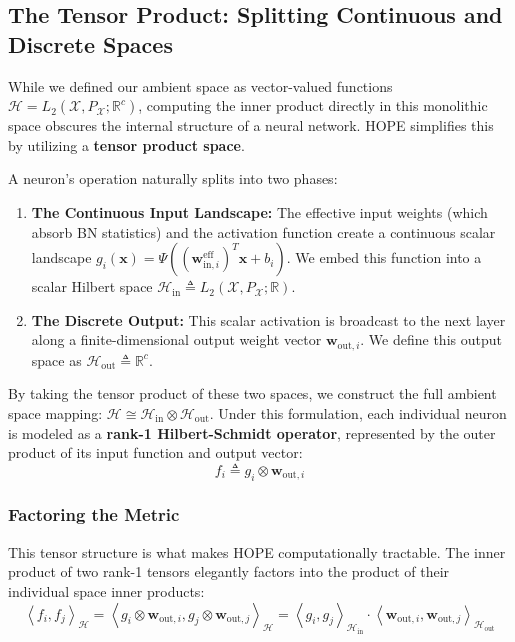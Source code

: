 \documentclass[11pt, a4paper, copyright, gdm]{google}
\newcommand{\inner}[2]{\left\langle#1, #2\right\rangle}
\newcommand{\wVect}{\boldsymbol{w}}
\newcommand{\xVect}{\boldsymbol{x}}
\newcommand{\calH}{\mathcal{H}}
\newcommand{\calX}{\mathcal{X}}
\newcommand{\R}{\mathbb{R}}
\theoremstyle{definition}
\begin{document}
\subsection{The Tensor Product: Splitting Continuous and Discrete Spaces}

While we defined our ambient space as vector-valued functions $\calH = L_2(\calX, P_{\calX}; \R^c)$, computing the inner product directly in this monolithic space obscures the internal structure of a neural network. HOPE simplifies this by utilizing a \textbf{tensor product space}.

A neuron's operation naturally splits into two phases:
\begin{enumerate}
    \item \textbf{The Continuous Input Landscape:} The effective input weights (which absorb BN statistics) and the activation function create a continuous scalar landscape $g_i(\xVect) = \Psi((\wVect_{\text{in},i}^{\text{eff}})^T \xVect + b_i)$. We embed this function into a scalar Hilbert space $\calH_{\text{in}} \triangleq L_2(\calX, P_{\calX}; \R)$.
    \item \textbf{The Discrete Output:} This scalar activation is broadcast to the next layer along a finite-dimensional output weight vector $\wVect_{\text{out}, i}$. We define this output space as $\calH_{\text{out}} \triangleq \R^c$.
\end{enumerate}

By taking the tensor product of these two spaces, we construct the full ambient space mapping: $\calH \cong \calH_{\text{in}} \otimes \calH_{\text{out}}$. Under this formulation, each individual neuron is modeled as a \textbf{rank-1 Hilbert-Schmidt operator}, represented by the outer product of its input function and output vector:
\begin{equation}
    f_i \triangleq g_i \otimes \wVect_{\text{out}, i}
\end{equation}

\subsubsection{Factoring the Metric}
This tensor structure is what makes HOPE computationally tractable. The inner product of two rank-1 tensors elegantly factors into the product of their individual space inner products:
\begin{equation}
    \inner{f_i}{f_j}_{\calH} = \inner{g_i \otimes \wVect_{\text{out},i}}{g_j \otimes \wVect_{\text{out},j}}_{\calH} = \inner{g_i}{g_j}_{\calH_{\text{in}}} \cdot \inner{\wVect_{\text{out},i}}{\wVect_{\text{out},j}}_{\calH_{\text{out}}}
\end{equation}
\end{document}
